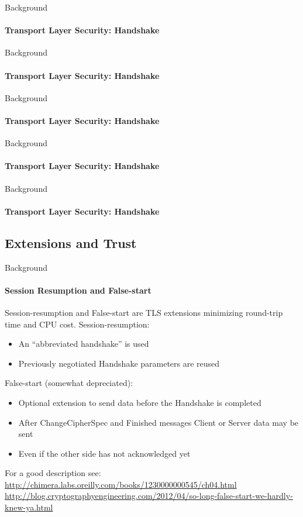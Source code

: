\documentclass[hyperref={draft}]{beamer}
\begin{document}
\begin{frame}{Background}
  \framesubtitle{Transport Layer Security: Handshake}
  \fontsize{9}{7}\selectfont{}
\end{frame}

\begin{frame}{Background}
  \framesubtitle{Transport Layer Security: Handshake}
  \fontsize{9}{7}\selectfont{}
\end{frame}

\begin{frame}{Background}
  \framesubtitle{Transport Layer Security: Handshake}
  \fontsize{9}{7}\selectfont{}
\end{frame}

\begin{frame}{Background}
  \framesubtitle{Transport Layer Security: Handshake}
  \fontsize{9}{7}\selectfont{}
\end{frame}

\begin{frame}{Background}
  \framesubtitle{Transport Layer Security: Handshake}
  \fontsize{9}{7}\selectfont{}
\end{frame}

\subsection{Extensions and Trust}

\begin{frame}{Background}
  \framesubtitle{Session Resumption and False-start}
  Session-resumption and False-start are TLS extensions minimizing round-trip time and CPU cost.
  \newline
  \newline
  Session-resumption:
  \begin{itemize}
    \item An ``abbreviated handshake'' is used
    \item Previously negotiated Handshake parameters are reused
  \end{itemize}
  False-start (somewhat depreciated):
  \begin{itemize}
    \item Optional extension to send data before the Handshake is completed
    \item After ChangeCipherSpec and Finished messages Client or Server data may be sent
    \item Even if the other side has not acknowledged yet
  \end{itemize}

  \tiny
  For a good description see: \url{http://chimera.labs.oreilly.com/books/1230000000545/ch04.html}\\
  \url{http://blog.cryptographyengineering.com/2012/04/so-long-false-start-we-hardly-knew-ya.html}
\end{frame}
\end{document}
